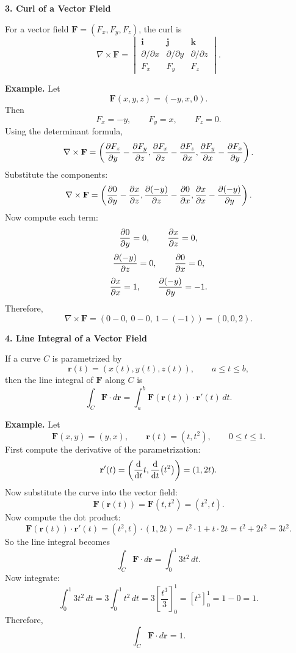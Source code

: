 \documentclass[a4paper,12pt]{letter}
\begin{document}
\textbf{3. Curl of a Vector Field}

For a vector field $\mathbf{F}=(F_x,F_y,F_z)$, the curl is
$$\nabla \times \mathbf{F}
=
\begin{vmatrix}
\mathbf{i} & \mathbf{j} & \mathbf{k} \\
\partial/\partial x & \partial/\partial y & \partial/\partial z \\
F_x & F_y & F_z
\end{vmatrix}.$$

\textbf{Example.} Let
$$\mathbf{F}(x,y,z)=(-y,x,0).$$
Then
$$F_x=-y,\qquad F_y=x,\qquad F_z=0.$$
Using the determinant formula,
$$\nabla\times\mathbf{F}
=
\left(
\pdv{F_z}{y}-\pdv{F_y}{z},
\pdv{F_x}{z}-\pdv{F_z}{x},
\pdv{F_y}{x}-\pdv{F_x}{y}
\right).$$
Substitute the components:
$$\nabla\times\mathbf{F}
=
\left(
\pdv{0}{y}-\pdv{x}{z},
\pdv{(-y)}{z}-\pdv{0}{x},
\pdv{x}{x}-\pdv{(-y)}{y}
\right).$$
Now compute each term:
$$\pdv{0}{y}=0,\qquad \pdv{x}{z}=0,$$
$$\pdv{(-y)}{z}=0,\qquad \pdv{0}{x}=0,$$
$$\pdv{x}{x}=1,\qquad \pdv{(-y)}{y}=-1.$$
Therefore,
$$\nabla\times\mathbf{F}
=
(0-0,\ 0-0,\ 1-(-1))
=
(0,0,2).$$

\begin{center}
\end{center}

\textbf{4. Line Integral of a Vector Field}

If a curve $C$ is parametrized by
$$\mathbf{r}(t)=(x(t),y(t),z(t)),\qquad a\le t\le b,$$
then the line integral of $\mathbf{F}$ along $C$ is
$$\int_C \mathbf{F}\cdot d\mathbf{r}
=
\int_a^b \mathbf{F}(\mathbf{r}(t))\cdot \mathbf{r}'(t)\,dt.$$

\textbf{Example.} Let
$$\mathbf{F}(x,y)=(y,x),
\qquad
\mathbf{r}(t)=(t,t^2),
\qquad 0\le t\le 1.$$
First compute the derivative of the parametrization:
$$\mathbf{r}'(t)=\left(\dv{t}t,\dv{t}(t^2)\right)=(1,2t).$$
Now substitute the curve into the vector field:
$$\mathbf{F}(\mathbf{r}(t))
=
\mathbf{F}(t,t^2)
=
(t^2,t).$$
Now compute the dot product:
$$\mathbf{F}(\mathbf{r}(t))\cdot \mathbf{r}'(t)
=
(t^2,t)\cdot(1,2t)
=
t^2\cdot 1+t\cdot 2t
=
t^2+2t^2
=
3t^2.$$
So the line integral becomes
$$\int_C \mathbf{F}\cdot d\mathbf{r}
=
\int_0^1 3t^2\,dt.$$
Now integrate:
$$\int_0^1 3t^2\,dt
=
3\int_0^1 t^2\,dt
=
3\left[\frac{t^3}{3}\right]_0^1
=
[t^3]_0^1
=
1-0
=
1.$$
Therefore,
$$\int_C \mathbf{F}\cdot d\mathbf{r}=1.$$
\end{document}
